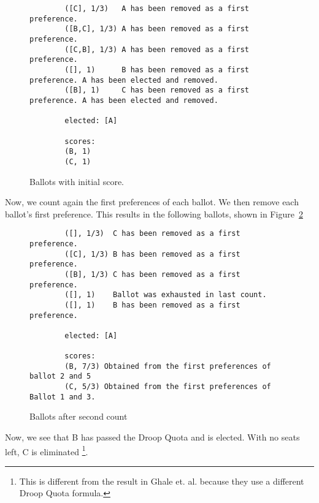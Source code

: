 \begin{figure}[ht!!!!!!!!]
    \caption{Ballots with initial score.}
    \label{sample_election1}
    \begin{lstlisting}
        ([C], 1/3)   A has been removed as a first preference. 
        ([B,C], 1/3) A has been removed as a first preference. 
        ([C,B], 1/3) A has been removed as a first preference. 
        ([], 1)      B has been removed as a first preference. A has been elected and removed. 
        ([B], 1)     C has been removed as a first preference. A has been elected and removed. 
        
        elected: [A]
        
        scores: 
        (B, 1)
        (C, 1)
    \end{lstlisting}
\end{figure}

Now, we count again the first preferences of each ballot. We then remove each
ballot's first preference. This results in the following ballots, shown in
Figure~\ref{sample_election2}

\begin{figure}[ht!!!!!!!!]
    \caption{Ballots after second count}
    \label{sample_election2}
    \begin{lstlisting}
        ([], 1/3)  C has been removed as a first preference. 
        ([C], 1/3) B has been removed as a first preference. 
        ([B], 1/3) C has been removed as a first preference. 
        ([], 1)    Ballot was exhausted in last count. 
        ([], 1)    B has been removed as a first preference. 
        
        elected: [A]
        
        scores: 
        (B, 7/3) Obtained from the first preferences of ballot 2 and 5
        (C, 5/3) Obtained from the first preferences of Ballot 1 and 3. 
    \end{lstlisting}
\end{figure}

Now, we see that B has passed the Droop Quota and is elected. With no seats
left, C is eliminated \footnote{This is different from the result in Ghale et.
al. because they use a different Droop Quota formula.}.

